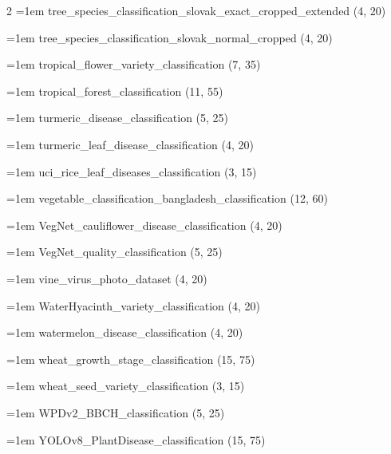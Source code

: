 \begin{multicols}{2}
\hangindent=1em tree\_\allowbreak{}species\_\allowbreak{}classification\_\allowbreak{}slovak\_\allowbreak{}exact\_\allowbreak{}cropped\_\allowbreak{}extended (4, 20)\par
\hangindent=1em tree\_\allowbreak{}species\_\allowbreak{}classification\_\allowbreak{}slovak\_\allowbreak{}normal\_\allowbreak{}cropped (4, 20)\par
\hangindent=1em tropical\_\allowbreak{}flower\_\allowbreak{}variety\_\allowbreak{}classification (7, 35)\par
\hangindent=1em tropical\_\allowbreak{}forest\_\allowbreak{}classification (11, 55)\par
\hangindent=1em turmeric\_\allowbreak{}disease\_\allowbreak{}classification (5, 25)\par
\hangindent=1em turmeric\_\allowbreak{}leaf\_\allowbreak{}disease\_\allowbreak{}classification (4, 20)\par
\hangindent=1em uci\_\allowbreak{}rice\_\allowbreak{}leaf\_\allowbreak{}diseases\_\allowbreak{}classification (3, 15)\par
\hangindent=1em vegetable\_\allowbreak{}classification\_\allowbreak{}bangladesh\_\allowbreak{}classification (12, 60)\par
\hangindent=1em VegNet\_\allowbreak{}cauliflower\_\allowbreak{}disease\_\allowbreak{}classification (4, 20)\par
\hangindent=1em VegNet\_\allowbreak{}quality\_\allowbreak{}classification (5, 25)\par
\hangindent=1em vine\_\allowbreak{}virus\_\allowbreak{}photo\_\allowbreak{}dataset (4, 20)\par
\hangindent=1em WaterHyacinth\_\allowbreak{}variety\_\allowbreak{}classification (4, 20)\par
\hangindent=1em watermelon\_\allowbreak{}disease\_\allowbreak{}classification (4, 20)\par
\hangindent=1em wheat\_\allowbreak{}growth\_\allowbreak{}stage\_\allowbreak{}classification (15, 75)\par
\hangindent=1em wheat\_\allowbreak{}seed\_\allowbreak{}variety\_\allowbreak{}classification (3, 15)\par
\hangindent=1em WPDv2\_\allowbreak{}BBCH\_\allowbreak{}classification (5, 25)\par
\hangindent=1em YOLOv8\_\allowbreak{}PlantDisease\_\allowbreak{}classification (15, 75)\par
\end{multicols}

